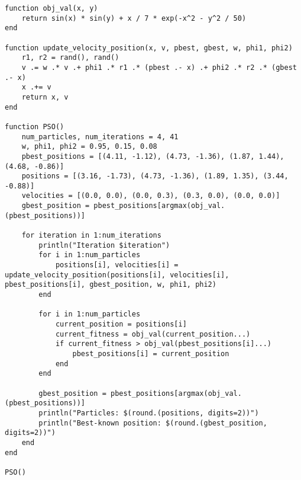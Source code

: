 \documentclass{article}
\begin{document}
\begin{flushleft} 
\begin{lstlisting}[caption={Particle Swarm Optimization in Julia}]
function obj_val(x, y)
    return sin(x) * sin(y) + x / 7 * exp(-x^2 - y^2 / 50)
end

function update_velocity_position(x, v, pbest, gbest, w, phi1, phi2)
    r1, r2 = rand(), rand()
    v .= w .* v .+ phi1 .* r1 .* (pbest .- x) .+ phi2 .* r2 .* (gbest .- x)
    x .+= v
    return x, v
end

function PSO()
    num_particles, num_iterations = 4, 41
    w, phi1, phi2 = 0.95, 0.15, 0.08
    pbest_positions = [(4.11, -1.12), (4.73, -1.36), (1.87, 1.44), (4.68, -0.86)]
    positions = [(3.16, -1.73), (4.73, -1.36), (1.89, 1.35), (3.44, -0.88)]
    velocities = [(0.0, 0.0), (0.0, 0.3), (0.3, 0.0), (0.0, 0.0)]
    gbest_position = pbest_positions[argmax(obj_val.(pbest_positions))]

    for iteration in 1:num_iterations
        println("Iteration $iteration")
        for i in 1:num_particles
            positions[i], velocities[i] = update_velocity_position(positions[i], velocities[i], pbest_positions[i], gbest_position, w, phi1, phi2)
        end

        for i in 1:num_particles
            current_position = positions[i]
            current_fitness = obj_val(current_position...)
            if current_fitness > obj_val(pbest_positions[i]...)
                pbest_positions[i] = current_position
            end
        end

        gbest_position = pbest_positions[argmax(obj_val.(pbest_positions))]
        println("Particles: $(round.(positions, digits=2))")
        println("Best-known position: $(round.(gbest_position, digits=2))")
    end
end

PSO()
\end{lstlisting}
\end{flushleft}
\end{document}
